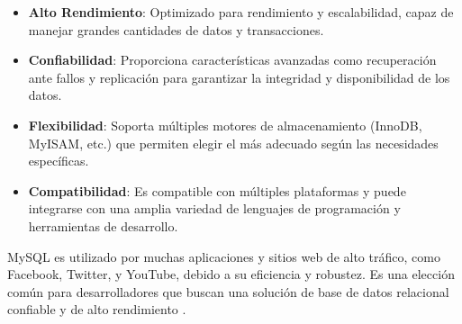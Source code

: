 \begin{itemize}
    \item \textbf{Alto Rendimiento}: Optimizado para rendimiento y escalabilidad, capaz de manejar grandes cantidades de datos y transacciones.
    \item \textbf{Confiabilidad}: Proporciona características avanzadas como recuperación ante fallos y replicación para garantizar la integridad y disponibilidad de los datos.
    \item \textbf{Flexibilidad}: Soporta múltiples motores de almacenamiento (InnoDB, MyISAM, etc.) que permiten elegir el más adecuado según las necesidades específicas.
    \item \textbf{Compatibilidad}: Es compatible con múltiples plataformas y puede integrarse con una amplia variedad de lenguajes de programación y herramientas de desarrollo.
\end{itemize}

MySQL es utilizado por muchas aplicaciones y sitios web de alto tráfico, como Facebook, Twitter, y YouTube, debido a su eficiencia y robustez. Es una elección común para desarrolladores que buscan una solución de base de datos relacional confiable y de alto rendimiento \cite{mysqlcookbook}.
